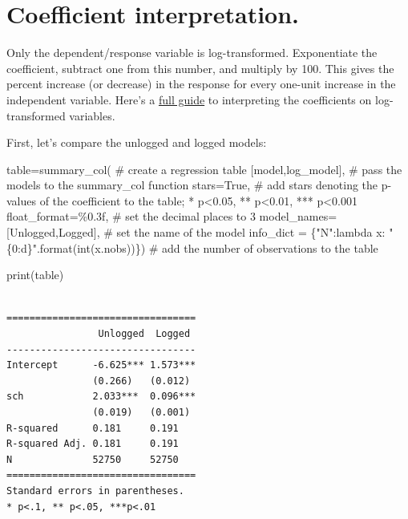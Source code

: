 \documentclass[
  letterpaper,
  DIV=11,
  numbers=noendperiod]{scrreprt}
\newenvironment{Shaded}{\begin{snugshade}}{\end{snugshade}}
\newcommand{\BuiltInTok}[1]{\textcolor[rgb]{0.00,0.23,0.31}{#1}}
\newcommand{\CommentTok}[1]{\textcolor[rgb]{0.37,0.37,0.37}{#1}}
\newcommand{\KeywordTok}[1]{\textcolor[rgb]{0.00,0.23,0.31}{#1}}
\newcommand{\NormalTok}[1]{\textcolor[rgb]{0.00,0.23,0.31}{#1}}
\newcommand{\OperatorTok}[1]{\textcolor[rgb]{0.37,0.37,0.37}{#1}}
\newcommand{\SpecialCharTok}[1]{\textcolor[rgb]{0.37,0.37,0.37}{#1}}
\newcommand{\StringTok}[1]{\textcolor[rgb]{0.13,0.47,0.30}{#1}}
\newcommand{\VariableTok}[1]{\textcolor[rgb]{0.07,0.07,0.07}{#1}}
\begin{document}
\hypertarget{coefficient-interpretation.}{%
\section{Coefficient
interpretation.}\label{coefficient-interpretation.}}

Only the dependent/response variable is log-transformed. Exponentiate
the coefficient, subtract one from this number, and multiply by 100.
This gives the percent increase (or decrease) in the response for every
one-unit increase in the independent variable. Here's a
\href{https://data.library.virginia.edu/interpreting-log-transformations-in-a-linear-model/\#:~:text=Interpret\%20the\%20coefficient\%20as\%20the,variable\%20increases\%20by\%20about\%200.20\%25.}{full
guide} to interpreting the coefficients on log-transformed variables.

First, let's compare the unlogged and logged models:

\begin{Shaded}
\begin{Highlighting}[]
\NormalTok{table}\OperatorTok{=}\NormalTok{summary\_col( }\CommentTok{\# create a regression table }
\NormalTok{    [model,log\_model], }\CommentTok{\# pass the models to the summary\_col function}
\NormalTok{    stars}\OperatorTok{=}\VariableTok{True}\NormalTok{, }\CommentTok{\# add stars denoting the p{-}values of the coefficient to the table; * p\textless{}0.05, ** p\textless{}0.01, *** p\textless{}0.001}
\NormalTok{    float\_format}\OperatorTok{=}\StringTok{\textquotesingle{}}\SpecialCharTok{\%0.3f}\StringTok{\textquotesingle{}}\NormalTok{, }\CommentTok{\# set the decimal places to 3}
\NormalTok{    model\_names}\OperatorTok{=}\NormalTok{[}\StringTok{\textquotesingle{}Unlogged\textquotesingle{}}\NormalTok{,}\StringTok{\textquotesingle{}Logged\textquotesingle{}}\NormalTok{], }\CommentTok{\# set the name of the model}
\NormalTok{    info\_dict }\OperatorTok{=}\NormalTok{ \{}\StringTok{"N"}\NormalTok{:}\KeywordTok{lambda}\NormalTok{ x: }\StringTok{"}\SpecialCharTok{\{0:d\}}\StringTok{"}\NormalTok{.}\BuiltInTok{format}\NormalTok{(}\BuiltInTok{int}\NormalTok{(x.nobs))\}) }\CommentTok{\# add the number of observations to the table}

\BuiltInTok{print}\NormalTok{(table)}
\end{Highlighting}
\end{Shaded}

\begin{verbatim}

=================================
                Unlogged  Logged 
---------------------------------
Intercept      -6.625*** 1.573***
               (0.266)   (0.012) 
sch            2.033***  0.096***
               (0.019)   (0.001) 
R-squared      0.181     0.191   
R-squared Adj. 0.181     0.191   
N              52750     52750   
=================================
Standard errors in parentheses.
* p<.1, ** p<.05, ***p<.01
\end{verbatim}
\end{document}
